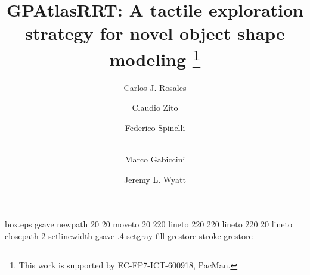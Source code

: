 \RequirePackage{fix-cm}

\begin{filecontents*}{box.eps}
gsave
newpath
  20 20 moveto
  20 220 lineto
  220 220 lineto
  220 20 lineto
closepath
2 setlinewidth
gsave
  .4 setgray fill
grestore
stroke
grestore
\end{filecontents*}

\documentclass[twocolumn,natbib,final]{svjour3}
\smartqed  %

\usepackage{graphicx}
\graphicspath{ {./img/} {../img/} }
\usepackage{multirow}
\usepackage{colortbl}
\usepackage{booktabs}
\usepackage[algoruled,vlined]{algorithm2e}
\usepackage{amsmath,amsfonts,amssymb,amsxtra,amsbsy,amsopn}
\usepackage{paralist}
\usepackage{booktabs}
\usepackage{tabularx}
\DeclareMathOperator*{\argmax}{arg\,max}

\usepackage[textsize=tiny]{todonotes}




\title{%
        GPAtlasRRT: A tactile exploration strategy for novel object shape modeling
  \thanks{This work is supported by EC-FP7-ICT-600918, PacMan.}
}

\author{Carlos J. Rosales         \and
        Claudio Zito              \and
        Federico Spinelli         \and \\
        Marco Gabiccini           \and
        Jeremy L. Wyatt
}


